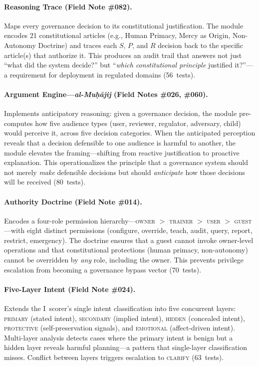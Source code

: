 \documentclass[11pt,a4paper]{article}
\begin{document}
\paragraph{Reasoning Trace (Field Note \#082).} Maps every governance decision to its constitutional justification. The module encodes 21 constitutional articles (e.g., Human Primacy, Mercy as Origin, Non-Autonomy Doctrine) and traces each $S$, $P$, and $R$ decision back to the specific article(s) that authorize it. This produces an audit trail that answers not just ``what did the system decide?'' but ``\emph{which constitutional principle} justified it?''---a requirement for deployment in regulated domains (56~tests).

\paragraph{Argument Engine---\emph{al-Mu\d{h}\=ajij} (Field Notes \#026, \#060).} Implements anticipatory reasoning: given a governance decision, the module pre-computes how five audience types (user, reviewer, regulator, adversary, child) would perceive it, across five decision categories. When the anticipated perception reveals that a decision defensible to one audience is harmful to another, the module elevates the framing---shifting from reactive justification to proactive explanation. This operationalizes the principle that a governance system should not merely \emph{make} defensible decisions but should \emph{anticipate} how those decisions will be received (80~tests).

\paragraph{Authority Doctrine (Field Note \#014).} Encodes a four-role permission hierarchy---\textsc{owner} $>$ \textsc{trainer} $>$ \textsc{user} $>$ \textsc{guest}---with eight distinct permissions (configure, override, teach, audit, query, report, restrict, emergency). The doctrine ensures that a guest cannot invoke owner-level operations and that constitutional protections (human primacy, non-autonomy) cannot be overridden by \emph{any} role, including the owner. This prevents privilege escalation from becoming a governance bypass vector (70~tests).

\paragraph{Five-Layer Intent (Field Note \#024).} Extends the I~scorer's single intent classification into five concurrent layers: \textsc{primary} (stated intent), \textsc{secondary} (implied intent), \textsc{hidden} (concealed intent), \textsc{protective} (self-preservation signals), and \textsc{emotional} (affect-driven intent). Multi-layer analysis detects cases where the primary intent is benign but a hidden layer reveals harmful planning---a pattern that single-layer classification misses. Conflict between layers triggers escalation to \textsc{clarify} (63~tests).
\end{document}

